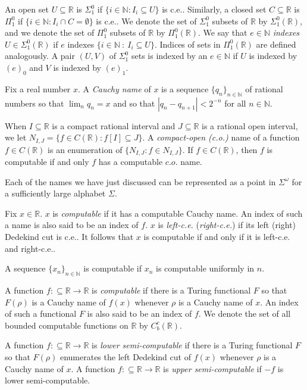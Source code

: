 \documentclass{amsart}
\newcommand{\R}{\mathbb{R}}
\newcommand{\N}{\mathbb{N}}
\theoremstyle{definition}
\numberwithin{equation}{section}
\begin{document}
An open set $U\subseteq\R$ is $\Sigma^0_1$ if $\{i\in\N:I_i\subseteq U\}$ is c.e.. 
Similarly, a closed set $C\subseteq\R$ is $\Pi^0_1$ if $\{i\in\N:I_i\cap C=\emptyset\}$ is c.e..
We denote the set of $\Sigma^0_1$ subsets of $\R$ by $\Sigma^0_1(\R)$, and we denote the set of $\Pi^0_1$ subsets of $\R$ by $\Pi^0_1(\R)$.
We say that $e \in \N$ \emph{indexes} $U \in \Sigma_1^0(\R)$ if $e$ indexes $\{i \in \N\ :\ I_i \subseteq U\}$.  
Indices of sets in $\Pi^0_1(\R)$ are defined analogously.  A pair $(U,V)$ of $\Sigma_1^0$ sets is indexed by an $e \in \N$ if $U$ is indexed by $(e)_0$ and $V$ is indexed by $(e)_1$.

Fix a real number $x$.  A \emph{Cauchy name} of $x$ is a sequence $\{q_n\}_{n \in \N}$ of rational numbers so that 
$\lim_n q_n = x$ and so that $|q_n - q_{n+1}| < 2^{-n}$ for all $n \in \N$.  

When $I\subseteq\R$ is a compact rational interval and $J\subseteq\R$ is a rational open interval, we let $N_{I,J}=\{f\in C(\R):f[I]\subseteq J\}$. 
A \emph{compact-open (c.o.)} name of a function $f\in C(\R)$ is an enumeration of $\{N_{I,J}:f\in N_{I,J}\}$.  
If $f \in C(\R)$, then $f$ is computable if and only $f$ has a computable $c.o.$ name.

Each of the names we have just discussed can be represented as a point in $\Sigma^\omega$ for a sufficiently large alphabet $\Sigma$.

Fix $x \in \R$.  $x$ is \emph{computable} if it has a computable Cauchy name.  An index of such a name is also said to be an index of $f$.  $x$ is \emph{left-c.e.} (\emph{right-c.e.}) if its left (right) Dedekind cut is c.e..  It follows that $x$ is computable if and only if it is left-c.e. and right-c.e..  

A sequence $\{x_n\}_{n \in \N}$ is computable if $x_n$ is computable uniformly in $n$.

A function $f:\subseteq\R\rightarrow\R$ is \emph{computable} if there is a Turing functional $F$ so that
$F(\rho)$ is a Cauchy name of $f(x)$ whenever $\rho$ is a Cauchy name of $x$.  An index of such a functional $F$ is also said to be an index of $f$.  We denote the set of all bounded computable functions on $\R$ by $C_b^c(\R)$.

A function $f: \subseteq \R \rightarrow \R$ is \emph{lower semi-computable} if there is a Turing functional $F$ so that 
$F(\rho)$ enumerates the left Dedekind cut of $f(x)$ whenever $\rho$ is a Cauchy name of $x$.
A function $f: \subseteq \R \rightarrow \R$ is \emph{upper semi-computable} if $-f$ is lower semi-computable.
\end{document}
